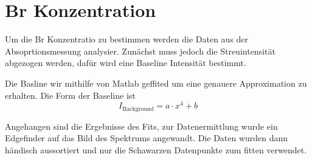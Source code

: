 \section*{Br Konzentration}

Um die Br Konzentratio zu bestimmen werden die Daten aus der Absoprtionsmessung analysier.
Zunächst muss jedoch die Streuintensität abgezogen werden, dafür wird eine Baseline Intensität bestimmt.


Die Basline wir mithilfe von Matlab geffited um eine genauere Approximation zu erhalten.
Die Form der Baseline ist 
\begin{equation*}
    I_{\mathrm{Background}} = a \cdot x^4 + b
\end{equation*}

Angehangen sind die Ergebnisse des Fits, zur Datenermittlung wurde ein Edgefinder auf das Bild des Spektrums angewandt.
Die Daten wurden dann händisch aussortiert und nur die Schawarzen Datenpunkte zum fitten verwendet.


